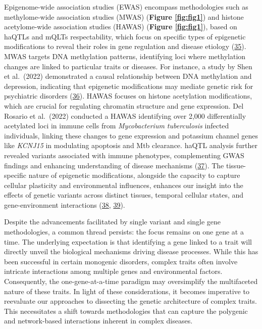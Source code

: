 Epigenome-wide association studies (EWAS) encompass methodologies such as methylome-wide association studies (MWAS) (\textbf{Figure \ref{fig:fig1}}) and histone acetylome-wide association studies (HAWAS) (\textbf{Figure \ref{fig:fig1}}), based on haQTLs and mQLTs respectability, which focus on specific types of epigenetic modifications to reveal their roles in gene regulation and disease etiology (\protect\hyperlink{ref-TPqvAJda}{35}).
MWAS targets DNA methylation patterns, identifying loci where methylation changes are linked to particular traits or diseases.
For instance, a study by Shen et al.~(2022) demonstrated a causal relationship between DNA methylation and depression, indicating that epigenetic modifications may mediate genetic risk for psychiatric disorders (\protect\hyperlink{ref-1DNxNkLsT}{36}).
HAWAS focuses on histone acetylation modifications, which are crucial for regulating chromatin structure and gene expression.
Del Rosario et al.~(2022) conducted a HAWAS identifying over 2,000 differentially acetylated loci in immune cells from \emph{Mycobacterium tuberculosis} infected individuals, linking these changes to gene expression and potassium channel genes like \emph{KCNJ15} in modulating apoptosis and Mtb clearance.
haQTL analysis further revealed variants associated with immune phenotypes, complementing GWAS findings and enhancing understanding of disease mechanisms (\protect\hyperlink{ref-1BYHeZlgB}{37}).
The tissue-specific nature of epigenetic modifications, alongside the capacity to capture cellular plasticity and environmental influences, enhances our insight into the effects of genetic variants across distinct tissues, temporal cellular states, and gene-environment interactions (\protect\hyperlink{ref-FeaSnwhX}{38}, \protect\hyperlink{ref-KfWCLspO}{39}).

Despite the advancements facilitated by single variant and single gene methodologies, a common thread persists: the focus remains on one gene at a time.
The underlying expectation is that identifying a gene linked to a trait will directly unveil the biological mechanisms driving disease processes.
While this has been successful in certain monogenic disorders, complex traits often involve intricate interactions among multiple genes and environmental factors.
Consequently, the one-gene-at-a-time paradigm may oversimplify the multifaceted nature of these traits.
In light of these considerations, it becomes imperative to reevaluate our approaches to dissecting the genetic architecture of complex traits.
This necessitates a shift towards methodologies that can capture the polygenic and network-based interactions inherent in complex diseases.

